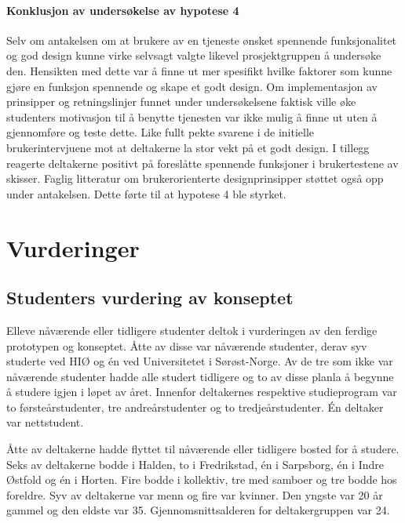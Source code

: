 \paragraph{Konklusjon av undersøkelse av hypotese 4}
Selv om antakelsen om at brukere av en tjeneste ønsket spennende funksjonalitet og god design kunne virke selvsagt valgte likevel prosjektgruppen å undersøke den. Hensikten med dette var å finne ut mer spesifikt hvilke faktorer som kunne gjøre en funksjon spennende og skape et godt design. Om implementasjon av prinsipper og retningslinjer funnet under undersøkelsene faktisk ville øke studenters motivasjon til å benytte tjenesten var ikke mulig å finne ut uten å gjennomføre og teste dette. Like fullt pekte svarene i de initielle brukerintervjuene mot at deltakerne la stor vekt på et godt design. I tillegg reagerte deltakerne positivt på foreslåtte spennende funksjoner i brukertestene av skisser. Faglig litteratur om brukerorienterte designprinsipper støttet også opp under antakelsen. Dette førte til at hypotese 4 ble styrket.


\section{Vurderinger}

\subsection{Studenters vurdering av konseptet}

Elleve nåværende eller tidligere studenter deltok i vurderingen av den ferdige prototypen og konseptet. Åtte av disse var nåværende studenter, derav syv studerte ved HIØ og én ved Universitetet i Sørøst-Norge. Av de tre som ikke var nåværende studenter hadde alle studert tidligere og to av disse planla å begynne å studere igjen i løpet av året. Innenfor deltakernes respektive studieprogram var to førsteårstudenter, tre andreårstudenter og to tredjeårstudenter. Én deltaker var nettstudent.

Åtte av deltakerne hadde flyttet til nåværende eller tidligere bosted for å studere. Seks av deltakerne bodde i Halden, to i Fredrikstad, én i Sarpsborg, én i Indre Østfold og én i Horten. Fire bodde i kollektiv, tre med samboer og tre bodde hos foreldre. Syv av deltakerne var menn og fire var kvinner. Den yngste var 20 år gammel og den eldste var 35. Gjennomsnittsalderen for deltakergruppen var 24.

